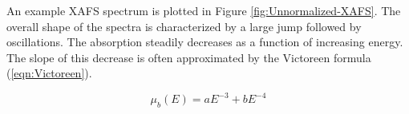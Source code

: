 


An example XAFS spectrum is plotted in Figure \ref{fig:Unnormalized-XAFS}. The overall shape of the spectra is characterized by a large jump followed by oscillations. The absorption steadily decreases as a function of increasing energy. The slope of this decrease is often approximated by the Victoreen formula (\ref{eqn:Victoreen}). 

\begin{equation}
    \label{eqn:Victoreen}
    \mu_b(E) = aE^{-3} + bE^{-4}
\end{equation}

